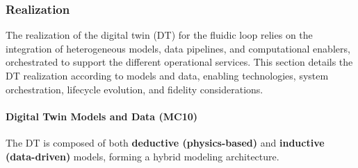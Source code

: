 \documentclass[
]{article}
\begin{document}
\subsubsection{Realization}\label{realization}

The realization of the digital twin (DT) for the fluidic loop relies on
the integration of heterogeneous models, data pipelines, and
computational enablers, orchestrated to support the different
operational services. This section details the DT realization according
to models and data, enabling technologies, system orchestration,
lifecycle evolution, and fidelity considerations.

\paragraph{Digital Twin Models and Data
(MC10)}\label{digital-twin-models-and-data-mc10}

The DT is composed of both \textbf{deductive (physics-based)} and
\textbf{inductive (data-driven)} models, forming a hybrid modeling
architecture.
\end{document}

